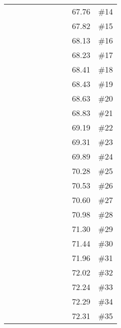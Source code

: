 \begin{longtable}{|c|c|c|c|c|c|c|c|c|c|}
 \x    & \x    & \x    & \x    & \x\m  &       & \x\m  &       & 67.76 & \#14 \\
 \x    & \x    & \x    &       & \x\m  & \x\m  & \x\m  &       & 67.82 & \#15 \\
 \x    & \x    & \x    &       & \x\m  & \x    & \x    &       & 68.13 & \#16 \\
 \x    & \x    & \x    & \x    & \x\m  & \x    &       & \x\m  & 68.23 & \#17 \\
 \x    & \x    & \x    & \x    & \x\m  &       &       & \x    & 68.41 & \#18 \\
 \x    & \x    & \x    &       & \x    & \x    & \x    &       & 68.43 & \#19 \\
 \x    & \x    &       & \x    & \x\m  & \x\m  &       & \x\m  & 68.63 & \#20 \\
 \x    & \x    & \x    & \x    & \x\m  &       &       & \x\m  & 68.83 & \#21 \\
 \x    & \x    & \x    &       & \x\m  &       & \x    &       & 69.19 & \#22 \\
 \x    & \x    & \x    & \x    & \x\m  & \x    &       & \x    & 69.31 & \#23 \\
 \x    & \x    & \x    &       & \x\m  &       & \x\m  &       & 69.89 & \#24 \\
 \x    & \x    & \x    & \x    & \x    & \x    &       & \x    & 70.28 & \#25 \\
 \x    & \x    & \x    &       & \x\m  &       & \x\m  &       & 70.53 & \#26 \\
 \x    & \x    & \x    & \x    & \x    & \x\m  &       & \x    & 70.60 & \#27 \\
 \x    & \x    & \x    &       & \x    & \x    &       &       & 70.98 & \#28 \\
 \x    & \x    & \x    &       & \x\m  & \x    &       & \x    & 71.30 & \#29 \\
 \x    & \x    & \x    &       & \x    & \x\m  &       &       & 71.44 & \#30 \\
 \x    & \x    & \x    &       &       &       &       &       & 71.96 & \#31 \\
 \x    & \x    & \x    & \x    & \x    &       &       & \x    & 72.02 & \#32 \\
 \x    & \x    & \x    & \x    & \x\m  &       & \x    &       & 72.24 & \#33 \\
 \x    & \x    & \x    &       & \x\m  & \x    & \x\m  &       & 72.29 & \#34 \\
 \x    & \x    & \x    &       & \x\m  & \x\m  &       &       & 72.31 & \#35 \\

\end{longtable}
